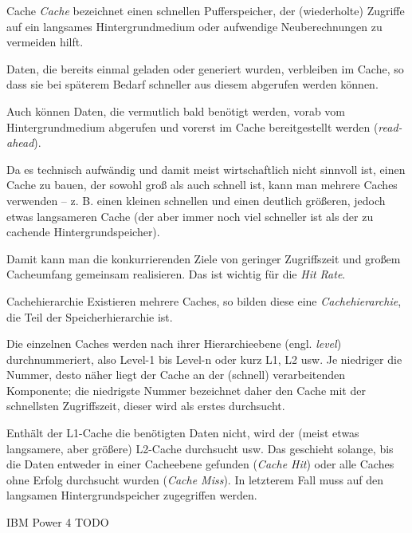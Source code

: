 \begin{defi}{Cache}
    \emph{Cache} bezeichnet einen schnellen Pufferspeicher, der (wiederholte) Zugriffe auf ein langsames Hintergrundmedium oder aufwendige Neuberechnungen zu vermeiden hilft.
    
    Daten, die bereits einmal geladen oder generiert wurden, verbleiben im Cache, so dass sie bei späterem Bedarf schneller aus diesem abgerufen werden können.
    
    Auch können Daten, die vermutlich bald benötigt werden, vorab vom Hintergrundmedium abgerufen und vorerst im Cache bereitgestellt werden (\emph{read-ahead}).
    
    Da es technisch aufwändig und damit meist wirtschaftlich nicht sinnvoll ist, einen Cache zu bauen, der sowohl groß als auch schnell ist, kann man mehrere Caches verwenden -- z. B. einen kleinen schnellen und einen deutlich größeren, jedoch etwas langsameren Cache (der aber immer noch viel schneller ist als der zu cachende Hintergrundspeicher).
    
    Damit kann man die konkurrierenden Ziele von geringer Zugriffszeit und großem Cacheumfang gemeinsam realisieren.
    Das ist wichtig für die \emph{Hit Rate}.
\end{defi}

\begin{defi}{Cachehierarchie}
    Existieren mehrere Caches, so bilden diese eine \emph{Cachehierarchie}, die Teil der Speicherhierarchie ist.
    
    Die einzelnen Caches werden nach ihrer Hierarchieebene (engl. \emph{level}) durchnummeriert, also Level-1 bis Level-n oder kurz L1, L2 usw.
    Je niedriger die Nummer, desto näher liegt der Cache an der (schnell) verarbeitenden Komponente;
    die niedrigste Nummer bezeichnet daher den Cache mit der schnellsten Zugriffszeit, dieser wird als erstes durchsucht.
    
    Enthält der L1-Cache die benötigten Daten nicht, wird der (meist etwas langsamere, aber größere) L2-Cache durchsucht usw.
    Das geschieht solange, bis die Daten entweder in einer Cacheebene gefunden (\emph{Cache Hit}) oder alle Caches ohne Erfolg durchsucht wurden (\emph{Cache Miss}).
    In letzterem Fall muss auf den langsamen Hintergrundspeicher zugegriffen werden.
\end{defi}

\begin{example}[Cachehierarchie]{IBM Power 4}
    TODO
\end{example}

